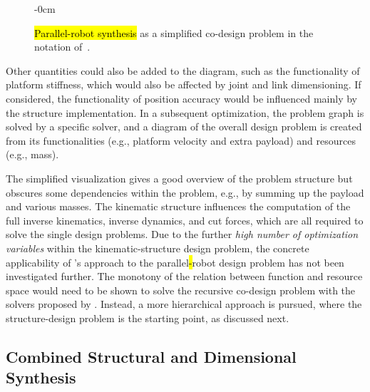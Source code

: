 \begin{figure}[H]
  \begin{adjustwidth}{-\extralength}{0cm}
    \centering
    \graphicspath{{Figures}}
    
  \end{adjustwidth}
  \caption{\hl{Parallel-robot synthesis} as a simplified co-design problem in the notation of~\cite{Censi2015}.}
  \label{fig:codesign_problem}
\end{figure}

%
Other quantities could also be added to the diagram, such as the functionality of platform stiffness, which would also be affected by joint and link dimensioning.
%
If considered, the functionality of position accuracy would be influenced mainly by the structure implementation.
In a subsequent optimization, the problem graph is solved by a specific solver, and a  diagram of the overall design problem is created from its functionalities (e.g., platform velocity and extra payload) and resources (e.g., mass).


The simplified visualization gives a good overview of the problem structure but obscures some dependencies within the problem, e.g., by summing up the payload and various masses. %
%
%
The kinematic structure influences the computation of the full inverse kinematics, inverse dynamics, and cut forces, {which are all} required to solve the single design problems.
Due to the further \emph{high number of optimization variables} within the kinematic-structure design problem, the concrete applicability of 's approach to the parallel\hl{-}robot design problem {has not been} investigated further.
The monotony of the relation between function and resource space would need to be shown to solve the recursive co-design problem with the solvers proposed by .
Instead, a more hierarchical approach is pursued, where the structure-design problem is the starting point, as discussed next.



\subsection{Combined Structural and Dimensional Synthesis}
\label{sec:ds_combstructgeomsynth}

